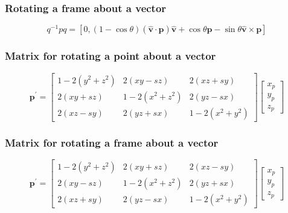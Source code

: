 \subsubsection*{Rotating a frame about a vector}
$$
q^{-1} p q=[0,(1-\cos \theta)(\hat{\mathbf{v}} \cdot \mathbf{p}) \hat{\mathbf{v}}+\cos \theta \mathbf{p}-\sin \theta \hat{\mathbf{v}} \times \mathbf{p}]
$$

\subsubsection*{Matrix for rotating a point about a vector}
$$
\mathbf{p}^{\prime}=\left[\begin{array}{ccc}
1-2\left(y^{2}+z^{2}\right) & 2(x y-s z) & 2(x z+s y) \\
2(x y+s z) & 1-2\left(x^{2}+z^{2}\right) & 2(y z-s x) \\
2(x z-s y) & 2(y z+s x) & 1-2\left(x^{2}+y^{2}\right)
\end{array}\right]\left[\begin{array}{c}
x_{p} \\
y_{p} \\
z_{p}
\end{array}\right]
$$

\subsubsection*{Matrix for rotating a frame about a vector}
$$
\mathbf{p}^{\prime}=\left[\begin{array}{ccc}
1-2\left(y^{2}+z^{2}\right) & 2(x y+s z) & 2(x z-s y) \\
2(x y-s z) & 1-2\left(x^{2}+z^{2}\right) & 2(y z+s x) \\
2(x z+s y) & 2(y z-s x) & 1-2\left(x^{2}+y^{2}\right)
\end{array}\right]\left[\begin{array}{l}
x_{p} \\
y_{p} \\
z_{p}
\end{array}\right]
$$

